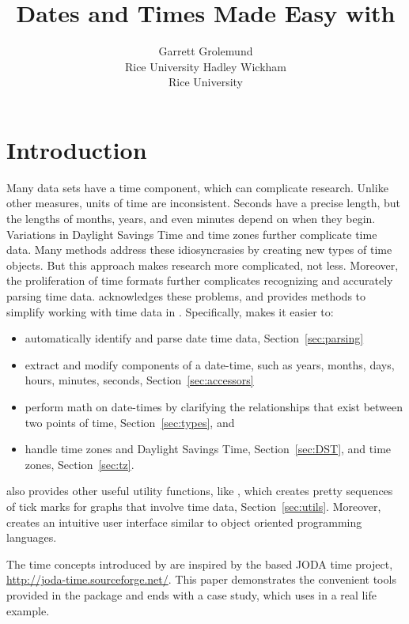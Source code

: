 \documentclass[article]{jss}
\author{Garrett Grolemund\\Rice University \And 
        Hadley Wickham\\Rice University}
\title{Dates and Times Made Easy with \pkg{lubridate}}
\begin{document}
\section{Introduction}

Many data sets have a time component, which can complicate research. Unlike other measures, units of time are inconsistent.  Seconds have a precise length, but the lengths of months, years, and even minutes depend on when they begin. Variations in Daylight Savings Time and time zones further complicate time data. Many  methods address these idiosyncrasies by creating new types of time objects.  But this approach makes research more complicated, not less. Moreover, the proliferation of time formats further complicates recognizing and accurately parsing time data.   acknowledges these problems, and provides methods to simplify working with time data in . Specifically,  makes it easier to:

\begin{itemize}
   \item automatically identify and parse date time data, Section~\ref{sec:parsing} 
   
    \item extract and modify components of a date-time, such as years, months, days, hours, minutes, seconds, Section~\ref{sec:accessors}
  
  \item perform math on date-times by clarifying the relationships that exist between two points of time, Section~\ref{sec:types}, and
    
  \item handle time zones and Daylight Savings Time, Section~\ref{sec:DST}, and time zones, Section~\ref{sec:tz}. 
  
\end{itemize}

 also provides other useful utility functions, like , which creates pretty sequences of tick marks for graphs that involve time data,  Section~\ref{sec:utils}. Moreover,  creates an intuitive user interface similar to object oriented programming languages.

The time concepts introduced by  are inspired by the  based JODA time project, \url{http://joda-time.sourceforge.net/}. This paper demonstrates the convenient tools provided in the  package and ends with a case study, which uses  in a real life example.
\end{document}
